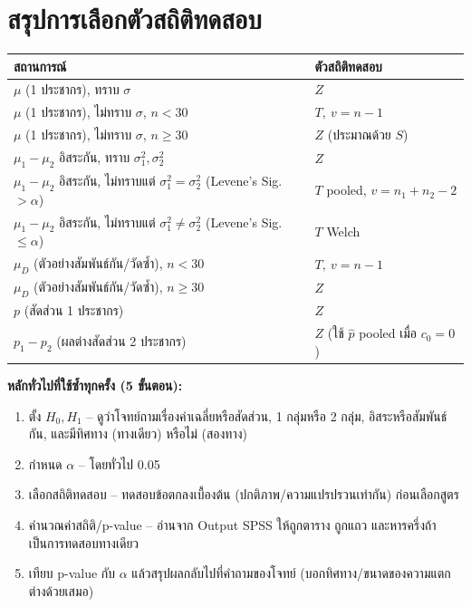 \documentclass[10pt]{extarticle}
\begin{document}
\section{สรุปการเลือกตัวสถิติทดสอบ}
\begin{center}\small
\begin{tabular}{@{}p{6.5cm}p{6.5cm}@{}}
\toprule
\textbf{สถานการณ์} & \textbf{ตัวสถิติทดสอบ}\\\midrule
$\mu$ (1 ประชากร), ทราบ $\sigma$ & $Z$\\
$\mu$ (1 ประชากร), ไม่ทราบ $\sigma$, $n<30$ & $T,\ v=n-1$\\
$\mu$ (1 ประชากร), ไม่ทราบ $\sigma$, $n\ge30$ & $Z$ (ประมาณด้วย $S$)\\
$\mu_1-\mu_2$ อิสระกัน, ทราบ $\sigma_1^2,\sigma_2^2$ & $Z$\\
$\mu_1-\mu_2$ อิสระกัน, ไม่ทราบแต่ $\sigma_1^2=\sigma_2^2$ (Levene's Sig.$>\alpha$) & $T$ pooled, $v=n_1+n_2-2$\\
$\mu_1-\mu_2$ อิสระกัน, ไม่ทราบแต่ $\sigma_1^2\ne\sigma_2^2$ (Levene's Sig.$\le\alpha$) & $T$ Welch\\
$\mu_D$ (ตัวอย่างสัมพันธ์กัน/วัดซ้ำ), $n<30$ & $T,\ v=n-1$\\
$\mu_D$ (ตัวอย่างสัมพันธ์กัน/วัดซ้ำ), $n\ge30$ & $Z$\\
$p$ (สัดส่วน 1 ประชากร) & $Z$\\
$p_1-p_2$ (ผลต่างสัดส่วน 2 ประชากร) & $Z$ (ใช้ $\hat p$ pooled เมื่อ $c_0=0$)\\
\bottomrule
\end{tabular}
\end{center}

\begin{formulabox}
\textbf{หลักทั่วไปที่ใช้ซ้ำทุกครั้ง (5 ขั้นตอน):}
\begin{enumerate}
\item ตั้ง $H_0,H_1$ -- ดูว่าโจทย์ถามเรื่องค่าเฉลี่ยหรือสัดส่วน, 1 กลุ่มหรือ 2 กลุ่ม, อิสระหรือสัมพันธ์กัน, และมีทิศทาง (ทางเดียว) หรือไม่ (สองทาง)
\item กำหนด $\alpha$ -- โดยทั่วไป 0.05
\item เลือกสถิติทดสอบ -- ทดสอบข้อตกลงเบื้องต้น (ปกติภาพ/ความแปรปรวนเท่ากัน) ก่อนเลือกสูตร
\item คำนวณค่าสถิติ/p-value -- อ่านจาก Output SPSS ให้ถูกตาราง ถูกแถว และหารครึ่งถ้าเป็นการทดสอบทางเดียว
\item เทียบ p-value กับ $\alpha$ แล้วสรุปผลกลับไปที่คำถามของโจทย์ (บอกทิศทาง/ขนาดของความแตกต่างด้วยเสมอ)
\end{enumerate}
\end{formulabox}
\end{document}
